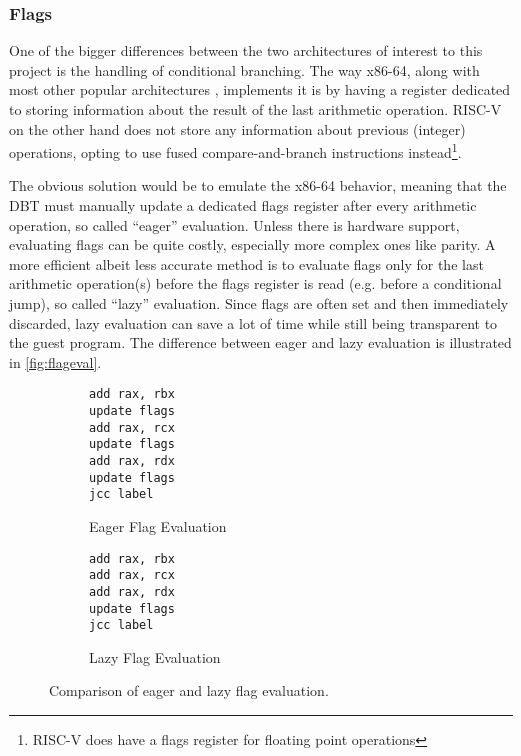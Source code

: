 	\subsubsection{Flags}
		\label{approach_flags}
		One of the bigger differences between the two architectures of interest to this project is the handling of conditional branching. The way x86-64, along with most other popular architectures \cite{arm, ppc}, implements it is by having a register dedicated to storing information about the result of the last arithmetic operation. RISC-V on the other hand does not store any information about previous (integer) operations, opting to use fused compare-and-branch instructions instead\footnote{RISC-V does have a flags register for floating point operations}.
		
		The obvious solution would be to emulate the x86-64 behavior, meaning that the DBT must manually update a dedicated flags register after every arithmetic operation, so called \enquote{eager} evaluation. Unless there is hardware support, evaluating flags can be quite costly, especially more complex ones like parity. A more efficient albeit less accurate method is to evaluate flags only for the last arithmetic operation(s) before the flags register is read (e.g. before a conditional jump), so called \enquote{lazy} evaluation. Since flags are often set and then immediately discarded, lazy evaluation can save a lot of time while still being transparent to the guest program. The difference between eager and lazy evaluation is illustrated in \autoref{fig:flageval}.
		
		\begin{figure}[htb]
			\centering
			\begin{subfigure}[b]{.5\textwidth}
				\centering
				\begin{lstlisting}[frame=none,xleftmargin=2.7cm]
add rax, rbx
update flags
add rax, rcx
update flags
add rax, rdx
update flags
jcc label
				\end{lstlisting}
				\caption{Eager Flag Evaluation}
				\label{fig:flageval-eager}
			\end{subfigure}%
			\begin{subfigure}[b]{.5\textwidth}
				\centering
				\begin{lstlisting}[frame=none,xleftmargin=2.7cm]
add rax, rbx
add rax, rcx
add rax, rdx
update flags
jcc label
				\end{lstlisting}
				\caption{Lazy Flag Evaluation}
				\label{fig:flageval-lazy}
			\end{subfigure}
			\caption{Comparison of eager and lazy flag evaluation.}
			\label{fig:flageval}
		\end{figure}

